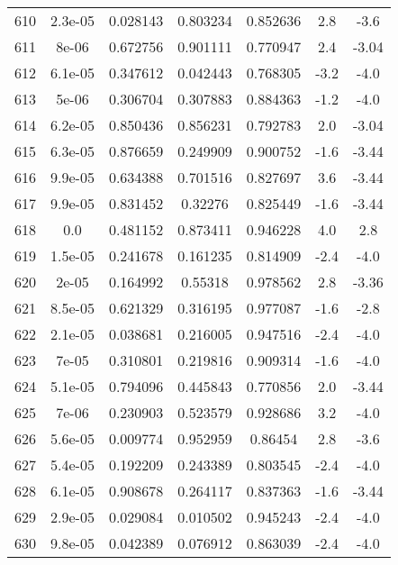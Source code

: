 \begin{table}
\begin{tabular}{c|c|c|c|c|c|c}
610 & 2.3e-05 & 0.028143 & 0.803234 & 0.852636 & 2.8 & -3.6\\
611 & 8e-06 & 0.672756 & 0.901111 & 0.770947 & 2.4 & -3.04\\
612 & 6.1e-05 & 0.347612 & 0.042443 & 0.768305 & -3.2 & -4.0\\
613 & 5e-06 & 0.306704 & 0.307883 & 0.884363 & -1.2 & -4.0\\
614 & 6.2e-05 & 0.850436 & 0.856231 & 0.792783 & 2.0 & -3.04\\
615 & 6.3e-05 & 0.876659 & 0.249909 & 0.900752 & -1.6 & -3.44\\
616 & 9.9e-05 & 0.634388 & 0.701516 & 0.827697 & 3.6 & -3.44\\
617 & 9.9e-05 & 0.831452 & 0.32276 & 0.825449 & -1.6 & -3.44\\
618 & 0.0 & 0.481152 & 0.873411 & 0.946228 & 4.0 & 2.8\\
619 & 1.5e-05 & 0.241678 & 0.161235 & 0.814909 & -2.4 & -4.0\\
620 & 2e-05 & 0.164992 & 0.55318 & 0.978562 & 2.8 & -3.36\\
621 & 8.5e-05 & 0.621329 & 0.316195 & 0.977087 & -1.6 & -2.8\\
622 & 2.1e-05 & 0.038681 & 0.216005 & 0.947516 & -2.4 & -4.0\\
623 & 7e-05 & 0.310801 & 0.219816 & 0.909314 & -1.6 & -4.0\\
624 & 5.1e-05 & 0.794096 & 0.445843 & 0.770856 & 2.0 & -3.44\\
625 & 7e-06 & 0.230903 & 0.523579 & 0.928686 & 3.2 & -4.0\\
626 & 5.6e-05 & 0.009774 & 0.952959 & 0.86454 & 2.8 & -3.6\\
627 & 5.4e-05 & 0.192209 & 0.243389 & 0.803545 & -2.4 & -4.0\\
628 & 6.1e-05 & 0.908678 & 0.264117 & 0.837363 & -1.6 & -3.44\\
629 & 2.9e-05 & 0.029084 & 0.010502 & 0.945243 & -2.4 & -4.0\\
630 & 9.8e-05 & 0.042389 & 0.076912 & 0.863039 & -2.4 & -4.0\\
\end{tabular}
\end{table}
\newpage
